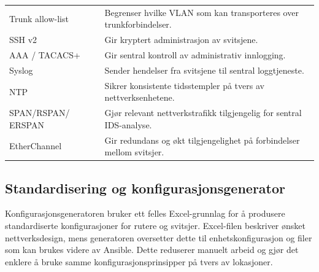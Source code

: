 \begin{table}[H]
\begin{tabular}{
    >{\raggedright\arraybackslash}p{3.8cm}
    >{\raggedright\arraybackslash}p{9.9cm}
}
Trunk allow-list &
Begrenser hvilke VLAN som kan transporteres over trunkforbindelser. \\

SSH v2 &
Gir kryptert administrasjon av svitsjene. \\

AAA / TACACS+ &
Gir sentral kontroll av administrativ innlogging. \\

Syslog &
Sender hendelser fra svitsjene til sentral loggtjeneste. \\

NTP &
Sikrer konsistente tidsstempler på tvers av nettverksenhetene. \\

SPAN/RSPAN/
ERSPAN &
Gjør relevant nettverkstrafikk tilgjengelig for sentral IDS-analyse. \\

EtherChannel &
Gir redundans og økt tilgjengelighet på forbindelser mellom svitsjer. \\

\bottomrule

\end{tabular}


\label{tab:switch-security}

\end{table}


\subsection{Standardisering og konfigurasjonsgenerator}

Konfigurasjonsgeneratoren bruker ett felles Excel-grunnlag for å produsere standardiserte konfigurasjoner for rutere og svitsjer. Excel-filen beskriver ønsket nettverksdesign, mens generatoren oversetter dette til enhetskonfigurasjon og filer som kan brukes videre av Ansible. Dette reduserer manuelt arbeid og gjør det enklere å bruke samme konfigurasjonsprinsipper på tvers av lokasjoner.

